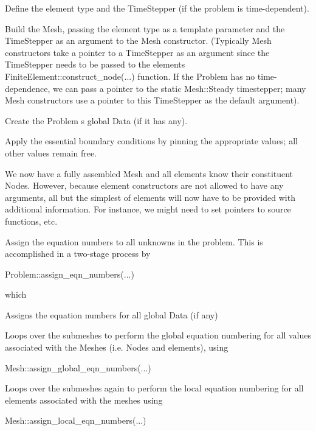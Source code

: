 \begin{DoxyEnumerate}
\item Define the element type and the {\ttfamily Time\+Stepper} (if the problem is time-\/dependent).
\item Build the {\ttfamily Mesh}, passing the element type as a template parameter and the {\ttfamily Time\+Stepper} as an argument to the Mesh constructor. (Typically {\ttfamily Mesh} constructors take a pointer to a {\ttfamily Time\+Stepper} as an argument since the {\ttfamily Time\+Stepper} needs to be passed to the element\textquotesingle{}s {\ttfamily Finite\+Element\+::construct\+\_\+node}(...) function. If the {\ttfamily Problem} has no time-\/dependence, we can pass a pointer to the static {\ttfamily Mesh\+::\+Steady} timestepper; many {\ttfamily Mesh} constructors use a pointer to this {\ttfamily Time\+Stepper} as the default argument).
\item Create the {\ttfamily Problem} \textquotesingle{}s global {\ttfamily Data} (if it has any).
\item Apply the essential boundary conditions by pinning the appropriate values; all other values remain free.
\item We now have a fully assembled {\ttfamily Mesh} and all elements know their constituent {\ttfamily Nodes}. However, because element constructors are not allowed to have any arguments, all but the simplest of elements will now have to be provided with additional information. For instance, we might need to set pointers to source functions, etc.
\item Assign the equation numbers to all unknowns in the problem. This is accomplished in a two-\/stage process by 
\begin{DoxyCode}
Problem::assign\_eqn\_numbers(...) 
\end{DoxyCode}
 which
\begin{DoxyEnumerate}
\item Assigns the equation numbers for all global {\ttfamily Data} (if any)
\item Loops over the submeshes to perform the global equation numbering for all values associated with the {\ttfamily Meshes} (i.\+e. {\ttfamily Nodes} and elements), using 
\begin{DoxyCode}
Mesh::assign\_global\_eqn\_numbers(...) 
\end{DoxyCode}

\item Loops over the submeshes again to perform the local equation numbering for all elements associated with the meshes using 
\begin{DoxyCode}
Mesh::assign\_local\_eqn\_numbers(...) 
\end{DoxyCode}


\end{DoxyEnumerate}
\end{DoxyEnumerate}
